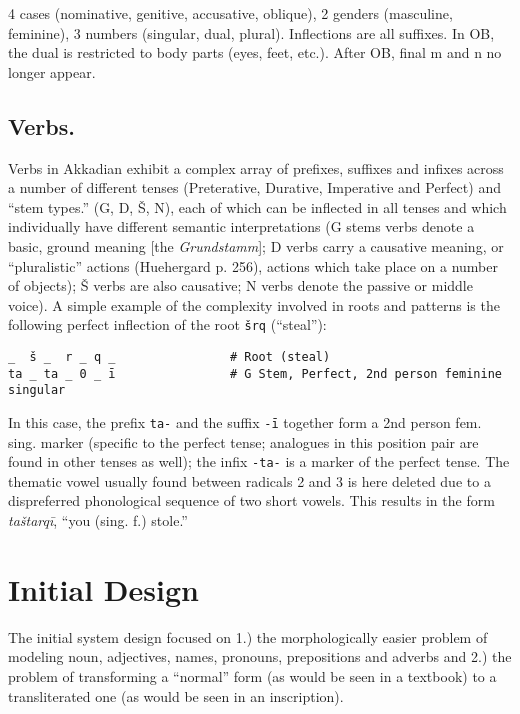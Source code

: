 \documentclass[11pt,letterpaper]{article}
\begin{document}
4 cases (nominative, genitive, accusative, oblique), 2 genders (masculine, feminine), 3 numbers (singular, dual, plural).  Inflections are all suffixes.  In OB, the dual is restricted to body parts (eyes, feet, etc.).  After OB, final m and n no longer appear.

\subsection{Verbs.} Verbs in Akkadian exhibit a complex array of prefixes, suffixes and infixes across a number of different tenses (Preterative, Durative, Imperative and Perfect) and ``stem types.''  (G, D, Š, N), each of which can be inflected in all tenses and which individually have different semantic interpretations (G stems verbs denote a basic, ground meaning [the \emph{Grundstamm}]; D verbs carry a causative meaning, or ``pluralistic'' actions (Huehergard p. 256), actions which take place on a number of objects);  Š verbs are also causative; N verbs denote the passive or middle voice).  A simple example of the complexity involved in roots and patterns is the following perfect inflection of the root  \texttt{šrq} (``steal''):

\begin{verbatim}
_  š _  r _ q _                # Root (steal)
ta _ ta _ 0 _ ī                # G Stem, Perfect, 2nd person feminine singular
\end{verbatim}

In this case, the prefix \texttt{ta-} and the suffix \texttt{-ī} together form a 2nd person fem. sing. marker (specific to the perfect tense; analogues in this position pair are found in other tenses as well); the infix \texttt{-ta-} is a marker of the perfect tense.  The thematic vowel usually found between radicals 2 and 3 is here deleted due to a dispreferred phonological sequence of two short vowels.  This results in the form \emph{taštarqī},  ``you (sing. f.) stole.''

\section{Initial Design}


The initial system design focused on 1.) the morphologically easier problem of modeling noun, adjectives, names, pronouns, prepositions and adverbs and 2.) the problem of transforming a ``normal'' form (as would be seen in a textbook) to a transliterated one (as would be seen in an inscription).
\end{document}
